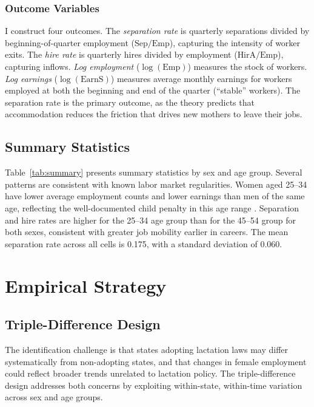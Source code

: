 \documentclass[12pt]{article}
\begin{document}
\subsubsection*{Outcome Variables} I construct four outcomes. The \emph{separation rate} is quarterly separations divided by beginning-of-quarter employment ($\text{Sep}/\text{Emp}$), capturing the intensity of worker exits. The \emph{hire rate} is quarterly hires divided by employment ($\text{HirA}/\text{Emp}$), capturing inflows. \emph{Log employment} ($\log(\text{Emp})$) measures the stock of workers. \emph{Log earnings} ($\log(\text{EarnS})$) measures average monthly earnings for workers employed at both the beginning and end of the quarter (``stable'' workers). The separation rate is the primary outcome, as the theory predicts that accommodation reduces the friction that drives new mothers to leave their jobs.

\subsection{Summary Statistics}



Table~\ref{tab:summary} presents summary statistics by sex and age group. Several patterns are consistent with known labor market regularities. Women aged 25--34 have lower average employment counts and lower earnings than men of the same age, reflecting the well-documented child penalty in this age range \citep{kleven2019}. Separation and hire rates are higher for the 25--34 age group than for the 45--54 group for both sexes, consistent with greater job mobility earlier in careers. The mean separation rate across all cells is 0.175, with a standard deviation of 0.060.


\section{Empirical Strategy}
\label{sec:strategy}

\subsection{Triple-Difference Design}

The identification challenge is that states adopting lactation laws may differ systematically from non-adopting states, and that changes in female employment could reflect broader trends unrelated to lactation policy. The triple-difference design addresses both concerns by exploiting within-state, within-time variation across sex and age groups.
\end{document}
